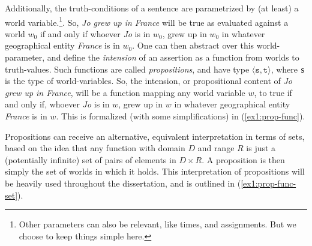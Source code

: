 Additionally, the truth-conditions of a sentence are parametrized by (at least) a world variable.\footnote{Other parameters can also be relevant, like times, and assignments. But we choose to keep things simple here.}. So, \textit{Jo grew up in France} will be true as evaluated against a world $w_0$ if and only if whoever \textit{Jo} is in $w_0$, grew up in $w_0$ in whatever geographical entity \textit{France} is in $w_0$. One can then abstract over this world-parameter, and define the \textit{intension} of an assertion as a function from worlds to truth-values. Such functions are called \textit{propositions}, and have type $\langle \texttt{s}, \texttt{t}\rangle$, where \texttt{s} is the type of world-variables. So, the intension, or propositional content of \textit{Jo grew up in France}, will be a function mapping any world variable $w$, to true if and only if, whoever \textit{Jo} is in $w$, grew up in $w$ in whatever geographical entity \textit{France} is in $w$. This is formalized (with some simplifications) in (\ref{ex1:prop-func}).

\begin{exe}
	\label{ex1:prop-func}
\end{exe}

Propositions can receive an alternative, equivalent interpretation in terms of sets, based on the idea that any function with domain $D$ and range $R$ is just a (potentially infinite) set of pairs of elements in $D\times R$. A proposition is then simply the set of worlds in which it holds. This interpretation of propositions will be heavily used throughout the dissertation, and is outlined in (\ref{ex1:prop-func-set}). 

\begin{exe}
	\label{ex1:prop-func-set}
\end{exe}

